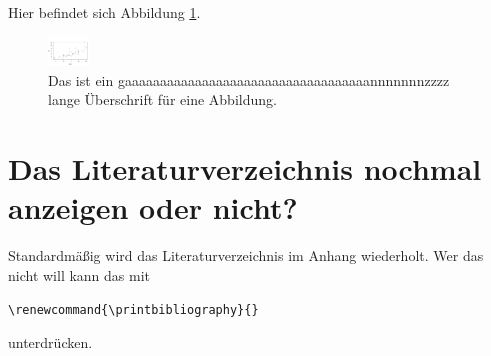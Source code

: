 \documentclass[
  doc]{apa7}
\begin{document}
Hier befindet sich Abbildung \ref{fig:plotcar2}.

\begin{figure}
\includegraphics[width=0.1\textwidth]{apa7vorlage_files/figure-latex/plotcar2-1} \caption{Das ist ein gaaaaaaaaaaaaaaaaaaaaaaaaaaaaaaaaaaannnnnnnzzzz lange Überschrift für eine Abbildung.}\label{fig:plotcar2}
\end{figure}

\hypertarget{das-literaturverzeichnis-nochmal-anzeigen-oder-nicht}{%
\section{Das Literaturverzeichnis nochmal anzeigen oder nicht?}\label{das-literaturverzeichnis-nochmal-anzeigen-oder-nicht}}

Standardmäßig wird das Literaturverzeichnis im Anhang wiederholt. Wer das nicht will kann das mit

\texttt{\textbackslash{}renewcommand\{\textbackslash{}printbibliography\}\{\}}

unterdrücken.

\renewcommand{\printbibliography}{}


\printbibliography
\end{document}
